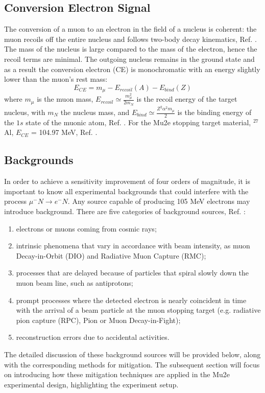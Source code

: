 \subsection{Conversion Electron Signal}
The conversion of a muon to an electron in the field of a nucleus is coherent: the muon recoils off the entire nucleus and follows two-body decay kinematics, Ref. \cite{bartoszek2015mu2e}. The mass of the nucleus is large compared to the mass of the electron, hence the recoil terms are minimal. The outgoing nucleus remains in the ground state and as a result the conversion electron (CE) is monochromatic with an energy slightly lower than the muon's rest mass:
\begin{equation}
    E_{CE} = m_\mu - E_{recoil}(A) - E_{bind}(Z) 
\end{equation}
where $m_\mu$ is the muon mass, $E_{recoil}\simeq \frac{m^2_\mu}{2 m_N}$ is the recoil energy of the target nucleus, with $m_N$ the nucleus mass, and $E_{bind}\simeq \frac{Z^2 \alpha^2 m_\mu}{2}$ is the binding energy of the $1s$ state of the muonic atom, Ref. \cite{universe9010054}. For the Mu2e stopping target material, $^{27}$Al, $E_{CE}$ = 104.97 MeV, Ref. \cite{PhysRevD.84.013006}.
\subsection{Backgrounds}\label{backgrounds}
In order to achieve a sensitivity improvement of four orders of magnitude, it is important to know all experimental backgrounds that could interfere with the process $\mu^- N \rightarrow e^- N $. Any source capable of producing 105 MeV electrons may introduce background. There are five categories of background sources, Ref. \cite{bartoszek2015mu2e}:
\begin{enumerate}
\item electrons or muons coming from cosmic rays;
\item intrinsic phenomena that vary in accordance with beam intensity, as muon Decay-in-Orbit (DIO) and Radiative Muon Capture (RMC);
\item processes that are delayed because of particles that spiral slowly down the muon beam line, such as antiprotons;
\item prompt processes where the detected electron is nearly coincident in time with the arrival of a beam particle at the muon stopping target (e.g. radiative pion capture (RPC), Pion or Muon Decay-in-Fight);
\item reconstruction errors due to accidental activities.
\end{enumerate}
The detailed discussion of these background sources will be provided below, along with the corresponding methods for mitigation. The subsequent section will focus on introducing how these mitigation techniques are applied in the Mu2e experimental design, highlighting the experiment setup.
